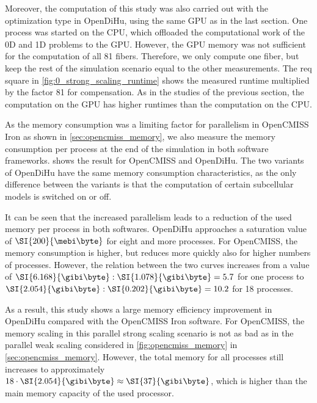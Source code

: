 Moreover, the computation of this study was also carried out with the  optimization type in OpenDiHu, using the same GPU as in the last section. One process was started on the CPU, which offloaded the computational work of the 0D and 1D problems to the GPU. However, the GPU memory was not sufficient for the computation of all 81 fibers. Therefore, we only compute one fiber, but keep the rest of the simulation scenario equal to the other measurements. The req square in \cref{fig:0_strong_scaling_runtime} shows the measured runtime multiplied by the factor 81 for compensation. As in the studies of the previous section, the computation on the GPU has higher runtimes than the computation on the CPU.

As the memory consumption was a limiting factor for parallelism in OpenCMISS Iron as shown in \cref{sec:opencmiss_memory}, we also measure the memory consumption per process at the end of the simulation in both software frameworks.  shows the result for OpenCMISS and OpenDiHu. The two variants of OpenDiHu have the same memory consumption characteristics, as the only difference between the variants is that the computation of certain subcellular models is switched on or off. 

It can be seen that the increased parallelism leads to a reduction of the used memory per process in both softwares. OpenDiHu approaches a saturation value of $\SI{200}{\mebi\byte}$ for eight and more processes. For OpenCMISS, the memory consumption is higher, but reduces more quickly also for higher numbers of processes. However, the relation between the two curves increases from a value of $\SI{6.168}{\gibi\byte} : \SI{1.078}{\gibi\byte} = 5.7$ for one process to $\SI{2.054}{\gibi\byte} : \SI{0.202}{\gibi\byte} = 10.2$ for 18 processes.

As a result, this study shows a large memory efficiency improvement in OpenDiHu compared with the OpenCMISS Iron software. For OpenCMISS, the memory scaling in this parallel strong scaling scenario is not as bad as in the parallel weak scaling considered in \cref{fig:opencmiss_memory} in \cref{sec:opencmiss_memory}. However, the total memory for all processes still increases to approximately $18 \cdot \SI{2.054}{\gibi\byte} \approx \SI{37}{\gibi\byte}$, which is higher than the main memory capacity of the used processor.

